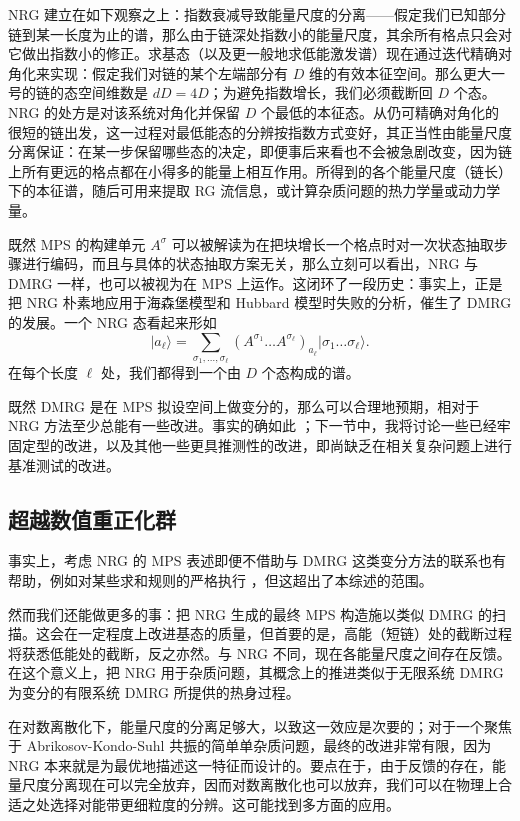 \documentclass[a4paper,10pt,oneside,onecolumn,1p,times]{elsarticle}
\newcommand{\ket}[1]{\mbox{$| #1  \rangle$}}
\begin{document}
NRG 建立在如下观察之上：指数衰减导致能量尺度的分离——假定我们已知部分链到某一长度为止的谱，那么由于链深处指数小的能量尺度，其余所有格点只会对它做出指数小的修正。求基态（以及更一般地求低能激发谱）现在通过迭代精确对角化来实现：假定我们对链的某个左端部分有 $D$ 维的有效本征空间。那么更大一号的链的态空间维数是 $dD=4D$；为避免指数增长，我们必须截断回 $D$ 个态。NRG 的处方是对该系统对角化并保留 $D$ 个最低的本征态。从仍可精确对角化的很短的链出发，这一过程对最低能态的分辨按指数方式变好，其正当性由能量尺度分离保证：在某一步保留哪些态的决定，即便事后来看也不会被急剧改变，因为链上所有更远的格点都在小得多的能量上相互作用。所得到的各个能量尺度（链长）下的本征谱，随后可用来提取 RG 流信息，或计算杂质问题的热力学量或动力学量。

既然 MPS 的构建单元 $A^\sigma$ 可以被解读为在把块增长一个格点时对一次状态抽取步骤进行编码，而且与具体的状态抽取方案无关，那么立刻可以看出，NRG 与 DMRG 一样，也可以被视为在 MPS 上运作\cite{Weichselbaum09}。这闭环了一段历史：事实上，正是把 NRG 朴素地应用于海森堡模型和 Hubbard 模型时失败的分析，催生了 DMRG 的发展。一个 NRG 态看起来形如
\begin{equation}
\ket{a_\ell} = \sum_{\sigma_1,\ldots,\sigma_\ell} (A^{\sigma_1} \ldots  A^{\sigma_\ell})_{a_\ell} \ket{\sigma_1\ldots\sigma_\ell}.
\end{equation}
在每个长度 $\ell$ 处，我们都得到一个由 $D$ 个态构成的谱。

既然 DMRG 是在 MPS 拟设空间上做变分的，那么可以合理地预期，相对于 NRG 方法至少总能有一些改进。事实的确如此 \cite{Weichselbaum09}；下一节中，我将讨论一些已经牢固定型的改进，以及其他一些更具推测性的改进，即尚缺乏在相关复杂问题上进行基准测试的改进。

\subsection{超越数值重正化群}
事实上，考虑 NRG 的 MPS 表述即便不借助与 DMRG 这类变分方法的联系也有帮助，例如对某些求和规则的严格执行 \cite{Weichselbaum07,Peters06}，但这超出了本综述的范围。

然而我们还能做更多的事：把 NRG 生成的最终 MPS 构造施以类似 DMRG 的扫描。这会在一定程度上改进基态的质量，但首要的是，高能（短链）处的截断过程将获悉低能处的截断，反之亦然。与 NRG 不同，现在各能量尺度之间存在反馈。在这个意义上，把 NRG 用于杂质问题，其概念上的推进类似于无限系统 DMRG 为变分的有限系统 DMRG 所提供的热身过程。

在对数离散化下，能量尺度的分离足够大，以致这一效应是次要的；对于一个聚焦于 Abrikosov-Kondo-Suhl 共振的简单单杂质问题，最终的改进非常有限，因为 NRG 本来就是为最优地描述这一特征而设计的。要点在于，由于反馈的存在，能量尺度分离现在可以完全放弃，因而对数离散化也可以放弃，我们可以在物理上合适之处选择对能带更细粒度的分辨。这可能找到多方面的应用。
\end{document}
